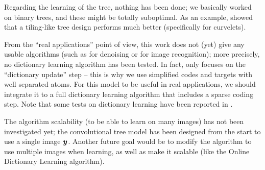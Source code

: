 \noindent
Regarding the learning of the tree, nothing has been done; we basically worked on binary trees, and these might be totally suboptimal. As an example, \cite{chabiron_optimization_2016} showed that a tiling-like tree design performs much better (specifically for curvelets).


From the “real applications” point of view, this work does not (yet) give any usable algorithms (such as for denoising or for image recognition); more precisely, no dictionary learning algorithm has been tested. In fact, only focuses on the “dictionary update” step – this is why we use simplified codes and targets with well separated atoms. For this model to be useful in real applications, we should integrate it to a full dictionary learning algorithm that includes a sparse coding step. Note that some tests on dictionary learning have been reported in \cite{chabiron_optimization_2016}. 

\noindent
The algorithm scalability (to be able to learn on many images) has not been investigated yet; the convolutional tree model has been designed from the start to use a single image $\bm{y}$. Another future goal would be to modify the algorithm to use multiple images when learning, as well as make it scalable (like the Online Dictionary Learning algorithm).



\clearpage
{}
\appendix

\chapter{}

